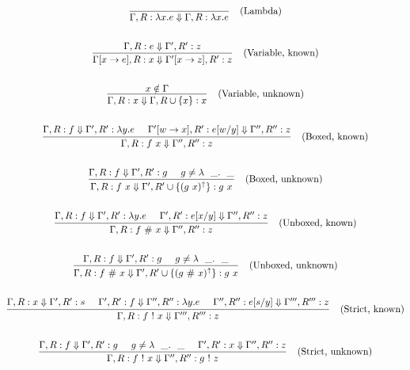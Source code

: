 \documentclass[a4paper]{article}
\begin{document}
\begin{gather*}
  \infer
      [\text{(Lambda)}]
      {\Gamma, R : \lambda x. e \reduces \Gamma, R : \lambda x. e}
      {}
      \\
      \\
  \infer
      [\text{(Variable, known)}]
      {\Gamma[x \to e], R : x \reduces \Gamma'[x \to z], R' : z}
      {\Gamma, R : e \reduces \Gamma', R' : z}
      \\
      \\
  \infer
      [\text{(Variable, unknown)}]
      {\Gamma, R : x \reduces \Gamma, R \cup \{x\} : x}
      {x \notin \Gamma}
      \\
      \\
  \infer
      [\text{(Boxed, known)}]
      {\Gamma,R : f \app x \reduces \Gamma'',R'' : z}
      {\Gamma,R : f \reduces \Gamma',R' : \lambda y. e \;\;\;\;\; \Gamma'[w \to x],R' : e[w/y] \reduces \Gamma'',R'' : z}
      \\
      \\
  \infer
      [\text{(Boxed, unknown)}]
      {\Gamma,R : f \app x \reduces \Gamma',R' \cup \{\uppity{(g \app x)}\} : g \app x}
      {\Gamma,R : f \reduces \Gamma',R' : g \;\;\;\;\; g \neq \lambda \_.\_}
      \\
      \\
  \infer
      [\text{(Unboxed, known)}]
      {\Gamma,R : f \unboxed x \reduces \Gamma'',R'' : z}
      {\Gamma,R : f \reduces \Gamma',R' : \lambda y. e \;\;\;\;\; \Gamma',R' : e[x/y] \reduces \Gamma'',R'' : z}
      \\
      \\
      \infer
      [\text{(Unboxed, unknown)}]
      {\Gamma,R : f \unboxed x \reduces \Gamma',R' \cup \{\uppity{(g \unboxed x)}\} : g \app x}
      {\Gamma,R : f \reduces \Gamma',R' : g \;\;\;\;\; g \neq \lambda \_.\_}
      \\
      \\
  \infer
      [\text{(Strict, known)}]
      {\Gamma, R : f \strict x \reduces \Gamma''', R''' : z}
      {\Gamma, R : x \reduces \Gamma', R' : s \;\;\;\;\; \Gamma', R' : f \reduces \Gamma'', R'' : \lambda y. e \;\;\;\;\; \Gamma'', R'' : e[s/y] \reduces \Gamma''', R''' : z}
      \\
      \\
  \infer
      [\text{(Strict, unknown)}]
      {\Gamma, R : f \strict x \reduces \Gamma'', R'' : g \strict z}
      {\Gamma,R : f \reduces \Gamma',R' : g \;\;\;\;\; g \neq \lambda \_.\_ \;\;\;\;\; \Gamma', R' : x \reduces \Gamma'', R'' : z}
      \\
      \\
\end{gather*}
\end{document}
